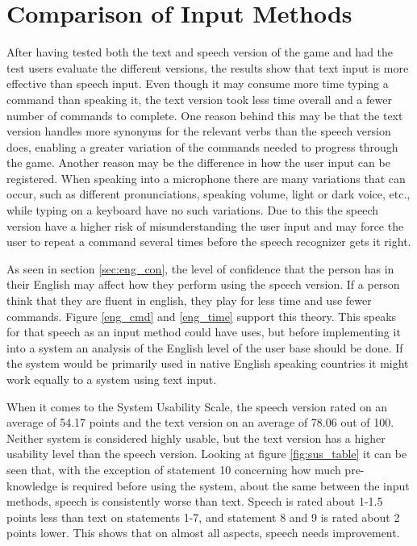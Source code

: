 \section{Comparison of Input Methods} %
After having tested both the text and speech version of the game and had the test users evaluate the different versions, the results show that text input is more effective than speech input. Even though it may consume more time typing a command than speaking it, the text version took less time overall and a fewer number of commands to complete. One reason behind this may be that the text version handles more synonyms for the relevant verbs than the speech version does, enabling a greater variation of the commands needed to progress through the game. Another reason may be the difference in how the user input can be registered. When speaking into a microphone there are many variations that can occur, such as different pronunciations, speaking volume, light or dark voice, etc., while typing on a keyboard have no such variations. Due to this the speech version have a higher risk of misunderstanding the user input and may force the user to repeat a command several times before the speech recognizer gets it right. 

As seen in section \ref{sec:eng_con}, the level of confidence that the person has in their English may affect how they perform using the speech version. If a person think that they are fluent in english, they play for less time and use fewer commands. Figure \ref{eng_cmd} and \ref{eng_time} support this theory. This speaks for that speech as an input method could have uses, but before implementing it into a system an analysis of the English level of the user base should be done. If the system would be primarily used in native English speaking countries it might work equally to a system using text input.

When it comes to the System Usability Scale, the speech version rated on an average of 54.17 points and the text version on an average of 78.06 out of 100. Neither system is considered highly usable, but the text version has a higher usability level than the speech version. Looking at figure \ref{fig:sus_table} it can be seen that, with the exception of statement 10 concerning how much pre-knowledge is required before using the system, about the same between the input methods, speech is consistently worse than text. Speech is rated about 1-1.5 points less than text on statements 1-7, and statement 8 and 9 is rated about 2 points lower. This shows that on almost all aspects, speech needs improvement. 

